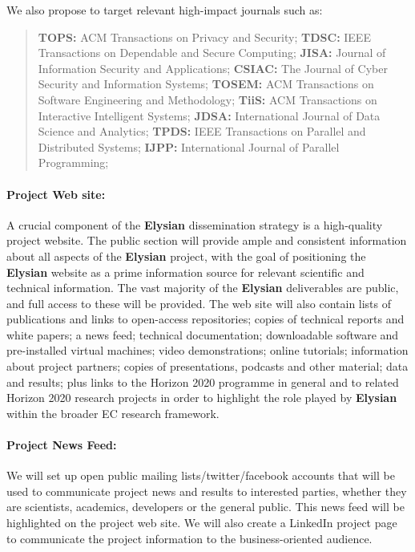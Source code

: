 \documentclass[a4paper,11pt]{article}
\newcommand{\project}[1]{\textbf{#1}\xspace}
\newcommand{\SECURITY}{\project{Elysian}}
\newcommand{\TheProject}{\SECURITY}
\begin{document}
\noindent
We also propose to target relevant high-impact journals such as:
\begin{quote}
\textbf{TOPS:} ACM Transactions on Privacy and Security;
\textbf{TDSC:} IEEE Transactions on Dependable and Secure Computing;
\textbf{JISA:} Journal of Information Security and Applications;
\textbf{CSIAC:} The Journal of Cyber Security and Information Systems;
\textbf{TOSEM:} ACM Transactions on Software Engineering and Methodology;
\textbf{TiiS:} ACM Transactions on Interactive Intelligent Systems;
\textbf{JDSA:} International Journal of Data Science and Analytics;
\textbf{TPDS:} IEEE Transactions on Parallel and Distributed Systems;
\textbf{IJPP:} International Journal of Parallel Programming;
\end{quote}

\paragraph{Project Web site:}  
A crucial component of the \TheProject{} dissemination strategy is a
high-quality project website. The public section will provide ample
and consistent information about all aspects of the \TheProject{}
project, with the goal of positioning the \TheProject{} website as a
prime information source for relevant scientific and technical
information.  The vast majority of the \TheProject{} deliverables are
public, and full access to these will be provided.  The web site will also contain lists of publications and links
to open-access repositories; copies of technical reports and white
papers; a news feed; technical documentation; downloadable software
and pre-installed virtual machines; video demonstrations; online
tutorials; information about project partners; copies of
presentations, podcasts and other material; data and results; plus
links to the Horizon 2020 programme in general and to related 
Horizon 2020 research projects in order to highlight the role played by \TheProject{} within the
broader EC research framework.

\paragraph{Project News Feed:}  We will set up open public mailing lists/twitter/facebook accounts that will
be used to communicate project news and results to interested parties, whether they are scientists, academics, developers
or the general public.  This news feed will be highlighted on the project web site. We will also create a LinkedIn project page to 
communicate the project information to the business-oriented audience.
\end{document}
